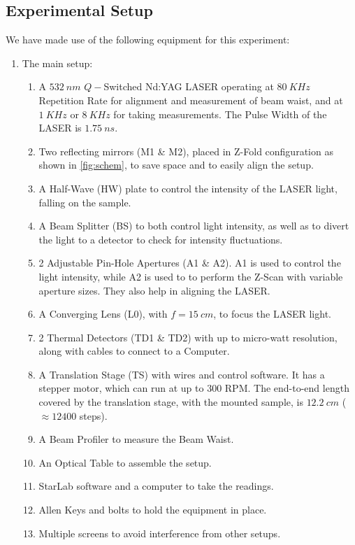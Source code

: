 \documentclass[%
 reprint,
amsmath,
amssymb,
10pt
]{revtex4-2}
\begin{document}
\subsection{\label{setup}Experimental Setup}
We have made use of the following equipment for this experiment:
\begin{enumerate}
    \item The main setup:
    \begin{enumerate}
        \item A $532\:nm$ $Q-$Switched Nd:YAG LASER operating at $80\:KHz$ Repetition Rate for alignment and measurement of beam waist, and at $1\:KHz$ or $8\:KHz$ for taking measurements. The Pulse Width of the LASER is $1.75\:ns$.
        \item Two reflecting mirrors (M1 \& M2), placed in Z-Fold configuration as shown in \ref{fig:schem}, to save space and to easily align the setup.
        \item A Half-Wave (HW) plate to control the intensity of the LASER light, falling on the sample.
        \item A Beam Splitter (BS) to both control light intensity, as well as to divert the light to a detector to check for intensity fluctuations.
        \item 2 Adjustable Pin-Hole Apertures (A1 \& A2). A1 is used to control the light intensity, while A2 is used to to perform the Z-Scan with variable aperture sizes. They also help in aligning the LASER.
        \item A Converging Lens (L0), with $f = 15\:cm$, to focus the LASER light.
        \item 2 Thermal Detectors (TD1 \& TD2) with up to micro-watt resolution, along with cables to connect to a Computer.
        \item A Translation Stage (TS) with wires and control software. It has a stepper motor, which can run at up to $300$ RPM. The end-to-end length covered by the translation stage, with the mounted sample, is $12.2\:cm$ ($\approx 12400$ steps).
        \item A Beam Profiler to measure the Beam Waist.
        \item An Optical Table to assemble the setup.
        \item StarLab software and a computer to take the readings.
        \item Allen Keys and bolts to hold the equipment in place.
        \item Multiple screens to avoid interference from other setups.

\end{enumerate}
\end{enumerate}
\end{document}

